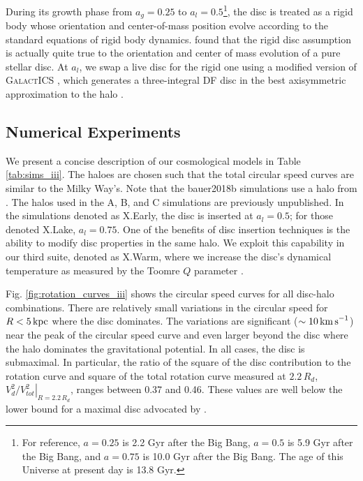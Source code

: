 During its growth phase from $a_g=0.25$ to $a_l=0.5$\footnote{For
  reference, $a=0.25$ is 2.2 Gyr after the Big Bang, $a=0.5$ is 5.9
  Gyr after the Big Bang, and $a=0.75$ is 10.0 Gyr after the Big
  Bang. The age of this Universe at present day is 13.8 Gyr.}, the
disc is treated as a rigid body whose orientation and center-of-mass
position evolve according to the standard equations of rigid body
dynamics. \citet{bauer2018a} found that the rigid disc assumption is
actually quite true to the orientation and center of mass evolution of
a pure stellar disc. At $a_l$, we swap a live disc for the rigid one
using a modified version of \textsc{GalactICS}
\citep{KGGalactICSReference,WPDGalactICSReference}, which generates a
three-integral DF disc in the best axisymmetric approximation to the
halo \citet{bauer2018a}.

\subsection{Numerical Experiments} \label{ssec:numerical_experiments}

We present a concise description of our cosmological models in Table
\ref{tab:sims_iii}. The haloes are chosen such that the total circular
speed curves are similar to the Milky Way's. Note that the bauer2018b
simulations use a halo from \cite{bauer2018b}. The halos used in the
A, B, and C simulations are previously unpublished.  In the
simulations denoted as X.Early, the disc is inserted at $a_l=0.5$; for
those denoted X.Lake, $a_l=0.75$.  One of the benefits of disc
insertion techniques is the ability to modify disc properties in the
same halo. We exploit this capability in our third suite, denoted as
X.Warm, where we increase the disc's dynamical temperature as
measured by the Toomre $Q$ parameter \citep{toomre_q}.
 
Fig. \ref{fig:rotation_curves_iii} shows the circular speed curves for all
disc-halo combinations. There are relatively small variations in the
circular speed for $R<5\,{\rm kpc}$ where the disc dominates. The
variations are significant ($\sim 10\,{\rm km\,s}^{-1}$) near the peak
of the circular speed curve and even larger beyond the disc where the
halo dominates the gravitational potential. In all cases, the disc is
submaximal. In particular, the ratio of the square of the disc
contribution to the rotation curve and square of the total rotation
curve measured at $2.2\, R_d$, $\left. V_d^2/V_{tot}^2 \right
\vert_{R=2.2\,R_d}$, ranges between 0.37 and 0.46. These values are
well below the lower bound for a maximal disc advocated by
\citet{sackett_1997}.


